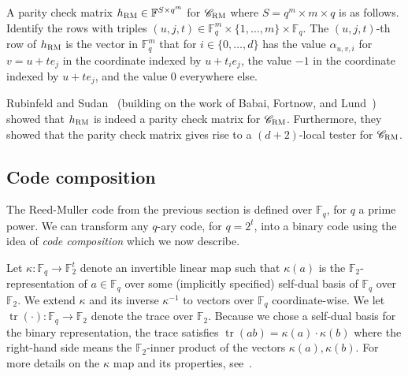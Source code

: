 \documentclass[11pt]{article}
\newtheorem{theorem}{Theorem}[section]
\theoremstyle{definition}
\newcommand{\code}{\mathscr{C}}
\newcommand{\F}{\ensuremath{\mathbb{F}}}
\newcommand{\mX}{\ensuremath{\mathcal{X}}}
\newcommand{\RM}{\ensuremath{\textsc{RM}}}
\DeclareMathOperator{\poly}{poly}
\newcommand{\eps}{\varepsilon}
\DeclareMathOperator{\tr}{tr}
\begin{document}
A parity check matrix $h_{\RM} \in \F^{S \times q^m}$ for $\code_{\RM}$ where $S = q^m \times m \times q$ is as follows. Identify the rows with triples $(u,j,t) \in \F_q^m \times \{1,\ldots,m\} \times \F_q$. The $(u,j,t)$-th row of $h_{\RM}$ is the vector in $\F_q^m$ that for $i \in \{0,\ldots,d\}$ has the value $\alpha_{u,v,i}$ for $v = u + t e_j$ in the coordinate indexed by $u + t_i e_j$, the value $-1$ in the coordinate indexed by $u + te_j$, and the value $0$ everywhere else. 

Rubinfeld and Sudan~\cite{rubinfeld1996robust} (building on the work of Babai, Fortnow, and Lund~\cite{babai1991non}) showed that $h_{\RM}$ is indeed a parity check matrix for $\code_{\RM}$. Furthermore, they showed that the parity check matrix gives rise to a $(d+2)$-local tester for $\code_{\RM}$. 




\subsection{Code composition}
\label{sec:code-comp}

 The Reed-Muller code from the previous section is defined over $\F_q$, for $q$ a prime power. We can transform any $q$-ary code, for $q=2^t$, into a binary code using the idea of \emph{code composition} which we now describe. 


Let $\kappa: \F_q \to \F_2^t$ denote an invertible linear map such that $\kappa(a)$ is the $\F_2$-representation of $a \in \F_q$ over some (implicitly specified) self-dual basis of $\F_q$ over $\F_2$. We extend $\kappa$ and its inverse $\kappa^{-1}$ to vectors over $\F_q$ coordinate-wise. We let $\tr(\cdot):\F_q\to\F_2$ denote the trace over $\F_2$. Because we chose a self-dual basis for the binary representation, the trace satisfies $\tr(ab)=\kappa(a)\cdot\kappa(b)$  where the right-hand side means the $\F_2$-inner product of the vectors $\kappa(a), \kappa(b)$. For more details on the $\kappa$ map and its properties, see~\cite[Section 3.3]{ji2020mip}.
\end{document}
